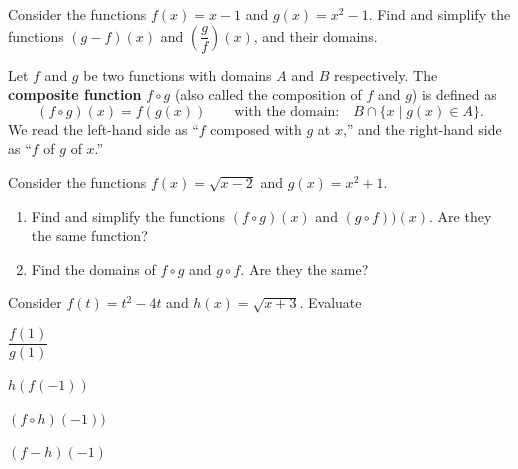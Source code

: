 \begin{example}
  Consider the functions \(f(x)=x-1\) and \(g(x)=x^2-1\). Find and simplify the functions \((g-f)(x)\) and \(\left(\dfrac{g}{f}\right)(x)\), and their domains.
\end{example}

\begin{definition}
  Let \(f\) and \(g\) be two functions with domains $A$ and $B$ respectively. The \textbf{composite function} $f\circ g$ (also called the
  composition of $f$ and $g$) is defined as
  \[(f\circ g)(x)=f(g(x))\qquad \text{with the domain:}\quad B\cap \{x\mid g(x)\in A\}.\]
\noindent
  We read the left-hand side as ``\(f\) composed with \(g\) at \(x\),'' and the right-hand side as ``\(f\) of \(g\) of \(x\).''
\end{definition}

\begin{example}
  Consider the functions \(f(x)=\sqrt{x-2}\) and \(g(x)=x^2+1\). 
  \begin{enumerate}
    \item Find and simplify the functions \((f\circ g)(x)\) and \((g\circ f))(x)\).  Are they the same function?
    \item Find the domains of $f\circ g$ and $g\circ f$. Are they the same?
  \end{enumerate}
\end{example}

\newpage

\begin{example}
  Consider $f(t)=t^2-4t$ and $h(x)=\sqrt{x+3}$. Evaluate\\ 
  \begin{enumerate*}
    \item $\dfrac{f(1)}{g(1)}$
    \item $h(f(-1))$
    \item $(f\circ h)(-1))$
    \item $(f-h)(-1)$
  \end{enumerate*}
\end{example}

\vspace*{2\baselineskip}

